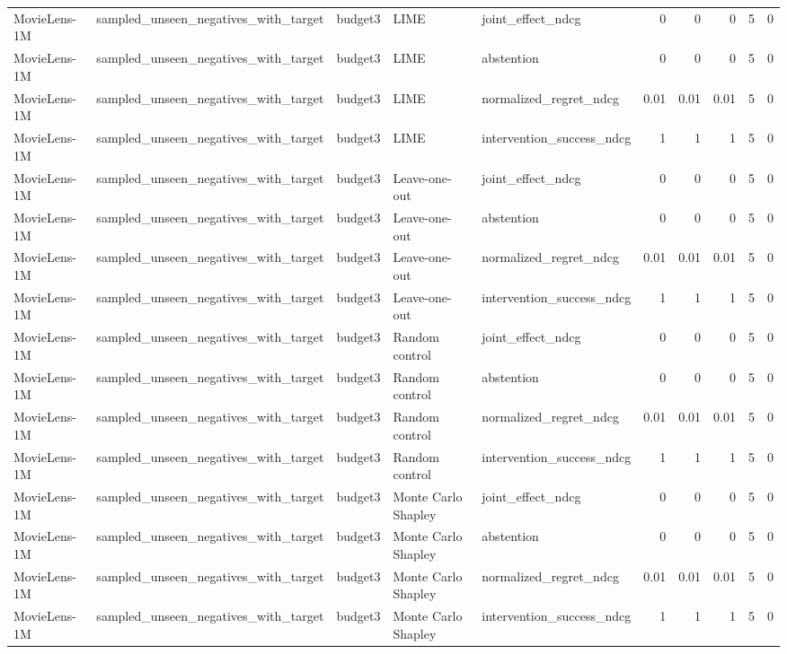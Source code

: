 \begin{table}[t]
{\begin{tabular}{lllllrrrrr}
MovieLens-1M & sampled\_unseen\_negatives\_with\_target & budget3 & LIME & joint\_effect\_ndcg & 0 & 0 & 0 & 5 & 0 \\
MovieLens-1M & sampled\_unseen\_negatives\_with\_target & budget3 & LIME & abstention & 0 & 0 & 0 & 5 & 0 \\
MovieLens-1M & sampled\_unseen\_negatives\_with\_target & budget3 & LIME & normalized\_regret\_ndcg & 0.01 & 0.01 & 0.01 & 5 & 0 \\
MovieLens-1M & sampled\_unseen\_negatives\_with\_target & budget3 & LIME & intervention\_success\_ndcg & 1 & 1 & 1 & 5 & 0 \\
MovieLens-1M & sampled\_unseen\_negatives\_with\_target & budget3 & Leave-one-out & joint\_effect\_ndcg & 0 & 0 & 0 & 5 & 0 \\
MovieLens-1M & sampled\_unseen\_negatives\_with\_target & budget3 & Leave-one-out & abstention & 0 & 0 & 0 & 5 & 0 \\
MovieLens-1M & sampled\_unseen\_negatives\_with\_target & budget3 & Leave-one-out & normalized\_regret\_ndcg & 0.01 & 0.01 & 0.01 & 5 & 0 \\
MovieLens-1M & sampled\_unseen\_negatives\_with\_target & budget3 & Leave-one-out & intervention\_success\_ndcg & 1 & 1 & 1 & 5 & 0 \\
MovieLens-1M & sampled\_unseen\_negatives\_with\_target & budget3 & Random control & joint\_effect\_ndcg & 0 & 0 & 0 & 5 & 0 \\
MovieLens-1M & sampled\_unseen\_negatives\_with\_target & budget3 & Random control & abstention & 0 & 0 & 0 & 5 & 0 \\
MovieLens-1M & sampled\_unseen\_negatives\_with\_target & budget3 & Random control & normalized\_regret\_ndcg & 0.01 & 0.01 & 0.01 & 5 & 0 \\
MovieLens-1M & sampled\_unseen\_negatives\_with\_target & budget3 & Random control & intervention\_success\_ndcg & 1 & 1 & 1 & 5 & 0 \\
MovieLens-1M & sampled\_unseen\_negatives\_with\_target & budget3 & Monte Carlo Shapley & joint\_effect\_ndcg & 0 & 0 & 0 & 5 & 0 \\
MovieLens-1M & sampled\_unseen\_negatives\_with\_target & budget3 & Monte Carlo Shapley & abstention & 0 & 0 & 0 & 5 & 0 \\
MovieLens-1M & sampled\_unseen\_negatives\_with\_target & budget3 & Monte Carlo Shapley & normalized\_regret\_ndcg & 0.01 & 0.01 & 0.01 & 5 & 0 \\
MovieLens-1M & sampled\_unseen\_negatives\_with\_target & budget3 & Monte Carlo Shapley & intervention\_success\_ndcg & 1 & 1 & 1 & 5 & 0 \\

\end{tabular}}
\end{table}
